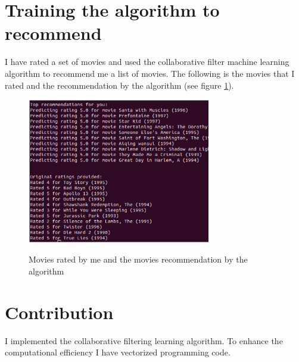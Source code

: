 \documentclass[twocolumn]{article}
\begin{document}
\section{Training the algorithm to recommend}
I have rated a set of movies and used the collaborative filter machine learning algorithm to recommend me a list of movies. The following is the movies that I rated and the recommendation by the algorithm (see figure \ref{fig:recommend}).
	   \begin{figure}[htbp]
                \centering
                \includegraphics[clip=true,trim=0cm 0cm 0cm 0cm,width=8cm]{../r_movie_rating_movie_recommended.ps}\\
                        \caption{Movies rated by me and the movies recommendation by the algorithm}
                \label{fig:recommend}
                \end{figure}
\section{Contribution}
I implemented the  collaborative filtering learning algorithm. To enhance the computational efficiency I have vectorized programming code.
\end{document}
